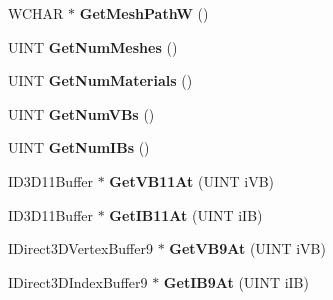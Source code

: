 \begin{DoxyCompactItemize}
\item 
\hypertarget{class_c_d_x_u_t_s_d_k_mesh_a07b095aa7aa524121f8088313a3b1ee8}{W\+C\+H\+A\+R $\ast$ {\bfseries Get\+Mesh\+Path\+W} ()}\label{class_c_d_x_u_t_s_d_k_mesh_a07b095aa7aa524121f8088313a3b1ee8}

\item 
\hypertarget{class_c_d_x_u_t_s_d_k_mesh_a672eadcebfa95730b17be81871abf552}{U\+I\+N\+T {\bfseries Get\+Num\+Meshes} ()}\label{class_c_d_x_u_t_s_d_k_mesh_a672eadcebfa95730b17be81871abf552}

\item 
\hypertarget{class_c_d_x_u_t_s_d_k_mesh_a9f5901423ce89048512acef5e55501da}{U\+I\+N\+T {\bfseries Get\+Num\+Materials} ()}\label{class_c_d_x_u_t_s_d_k_mesh_a9f5901423ce89048512acef5e55501da}

\item 
\hypertarget{class_c_d_x_u_t_s_d_k_mesh_a917bdacc65558b9d929ffc3ffae65d29}{U\+I\+N\+T {\bfseries Get\+Num\+V\+Bs} ()}\label{class_c_d_x_u_t_s_d_k_mesh_a917bdacc65558b9d929ffc3ffae65d29}

\item 
\hypertarget{class_c_d_x_u_t_s_d_k_mesh_a08a593f4864313ac70dc1df50aaf234f}{U\+I\+N\+T {\bfseries Get\+Num\+I\+Bs} ()}\label{class_c_d_x_u_t_s_d_k_mesh_a08a593f4864313ac70dc1df50aaf234f}

\item 
\hypertarget{class_c_d_x_u_t_s_d_k_mesh_a280f103238d6bda52def66763b00c7ef}{I\+D3\+D11\+Buffer $\ast$ {\bfseries Get\+V\+B11\+At} (U\+I\+N\+T i\+V\+B)}\label{class_c_d_x_u_t_s_d_k_mesh_a280f103238d6bda52def66763b00c7ef}

\item 
\hypertarget{class_c_d_x_u_t_s_d_k_mesh_a546c02d052e75773902b1b8fc0859534}{I\+D3\+D11\+Buffer $\ast$ {\bfseries Get\+I\+B11\+At} (U\+I\+N\+T i\+I\+B)}\label{class_c_d_x_u_t_s_d_k_mesh_a546c02d052e75773902b1b8fc0859534}

\item 
\hypertarget{class_c_d_x_u_t_s_d_k_mesh_ae52f63af89b90ec1017be59aef007c0d}{I\+Direct3\+D\+Vertex\+Buffer9 $\ast$ {\bfseries Get\+V\+B9\+At} (U\+I\+N\+T i\+V\+B)}\label{class_c_d_x_u_t_s_d_k_mesh_ae52f63af89b90ec1017be59aef007c0d}

\item 
\hypertarget{class_c_d_x_u_t_s_d_k_mesh_aedbac16798d1ba27ace9ccde71e49810}{I\+Direct3\+D\+Index\+Buffer9 $\ast$ {\bfseries Get\+I\+B9\+At} (U\+I\+N\+T i\+I\+B)}\label{class_c_d_x_u_t_s_d_k_mesh_aedbac16798d1ba27ace9ccde71e49810}


\end{DoxyCompactItemize}
